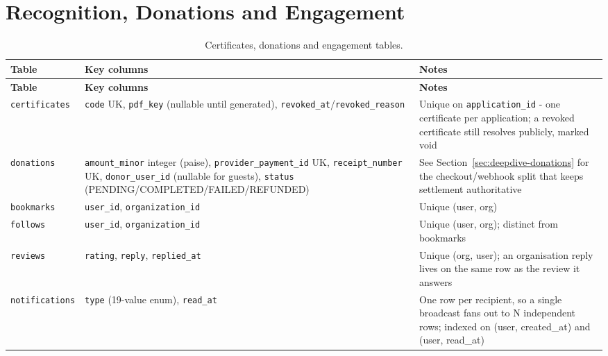 \section{Recognition, Donations and Engagement}
\begin{longtable}{|>{\raggedright\arraybackslash}p{}|>{\raggedright\arraybackslash}p{}|>{\raggedright\arraybackslash}p{}|}
\caption{Certificates, donations and engagement tables.}\\\hline
\textbf{Table} & \textbf{Key columns} & \textbf{Notes}\\\hline
\endfirsthead\hline\textbf{Table} & \textbf{Key columns} & \textbf{Notes}\\\hline\endhead
\texttt{certificates} & \texttt{code} UK, \texttt{pdf\_key} (nullable until generated), \texttt{revoked\_at}/\allowbreak\texttt{revoked\_reason} & Unique on \texttt{application\_id} - one certificate per application; a revoked certificate still resolves publicly, marked void\\\hline
\texttt{donations} & \texttt{amount\_minor} integer (paise), \texttt{provider\_\allowbreak payment\_id} UK, \texttt{receipt\_number} UK, \texttt{donor\_user\_id} (nullable for guests), \texttt{status} (PENDING/\allowbreak COMPLETED/\allowbreak FAILED/\allowbreak REFUNDED) & See Section~\ref{sec:deepdive-donations} for the checkout/webhook split that keeps settlement authoritative\\\hline
\texttt{bookmarks} & \texttt{user\_id}, \texttt{organization\_id} & Unique (user, org)\\\hline
\texttt{follows} & \texttt{user\_id}, \texttt{organization\_id} & Unique (user, org); distinct from bookmarks\\\hline
\texttt{reviews} & \texttt{rating}, \texttt{reply}, \texttt{replied\_at} & Unique (org, user); an organisation reply lives on the same row as the review it answers\\\hline
\texttt{notifications} & \texttt{type} (19-value enum), \texttt{read\_at} & One row per recipient, so a single broadcast fans out to N independent rows; indexed on (user, created\_at) and (user, read\_at)\\\hline
\end{longtable}

